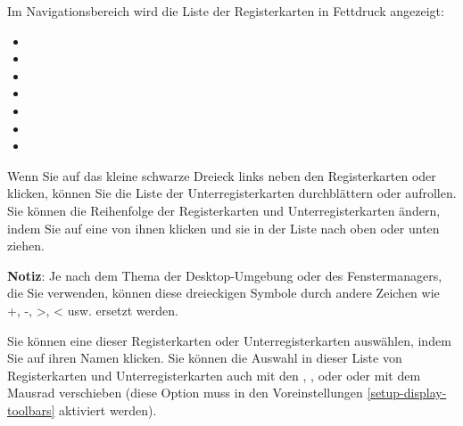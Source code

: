 Im Navigationsbereich wird die Liste der Registerkarten in Fettdruck angezeigt:
	\begin{itemize}
		\item {}%
		\item {}%
		\item {}%
		\item {}%
		\item {}%
		\item {}%
		\item {}%
	\end{itemize}
Wenn Sie auf das kleine schwarze Dreieck links neben den Registerkarten  oder  klicken, können Sie die Liste der Unterregisterkarten durchblättern oder aufrollen. Sie können die Reihenfolge der Registerkarten und Unterregisterkarten ändern, indem Sie auf eine von ihnen klicken und sie in der Liste nach oben oder unten ziehen.%


\textbf{Notiz}:  Je nach dem Thema der Desktop-Umgebung oder des Fenstermanagers, die Sie verwenden, können diese dreieckigen Symbole durch andere Zeichen wie +, -, >, < usw. ersetzt werden.%


Sie können eine dieser Registerkarten oder Unterregisterkarten auswählen, indem Sie auf ihren Namen klicken. Sie können die Auswahl in dieser Liste von Registerkarten und Unterregisterkarten auch mit den , ,  oder  oder mit dem Mausrad verschieben (diese Option muss in den Voreinstellungen \vref{setup-display-toolbars} aktiviert werden).%

